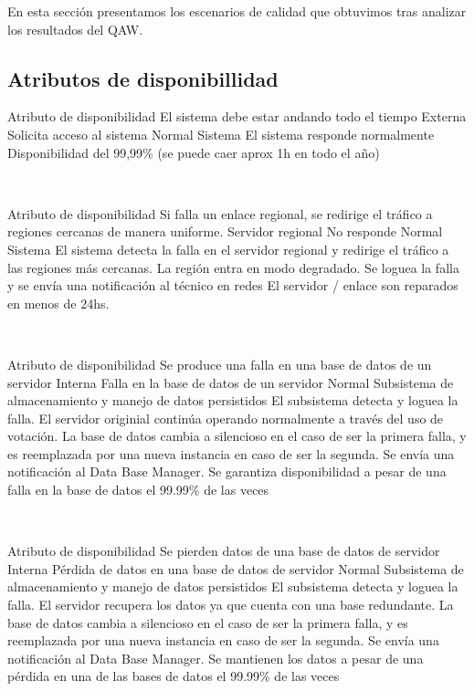 En esta sección presentamos los escenarios de calidad que obtuvimos tras analizar los resultados del QAW.

\subsection{Atributos de disponibillidad}

\escenario
{Atributo de disponibilidad}
{El sistema debe estar andando todo el tiempo}
{Externa}
{Solicita acceso al sistema}
{Normal}
{Sistema}
{El sistema responde normalmente}
{Disponibilidad del 99,99\% (se puede caer aprox 1h en todo el año)}


~

\escenario
{Atributo de disponibilidad}
{Si falla un enlace regional, se redirige el tráfico a regiones cercanas de manera uniforme.}
{Servidor regional}
{No responde}
{Normal}
{Sistema}
{El sistema detecta la falla en el servidor regional y redirige el tráfico a las regiones más cercanas. La región entra en modo degradado. Se loguea la falla y se envía una notificación al técnico en redes}
{El servidor / enlace son reparados en menos de 24hs.}


~

\escenario
{Atributo de disponibilidad}
{Se produce una falla en una base de datos de un servidor}
{Interna}
{Falla en la base de datos de un servidor}
{Normal}
{Subsistema de almacenamiento y manejo de datos persistidos}
{El subsistema detecta y loguea la falla. El servidor originial continúa operando normalmente a través del uso de votación. La base de datos cambia a silencioso en el caso de ser la primera falla, y es reemplazada por una nueva instancia en caso de ser la segunda. Se envía una notificación al Data Base Manager.}
{Se garantiza disponibilidad a pesar de una falla en la base de datos el 99.99\% de las veces}

~

\escenario
{Atributo de disponibilidad}
{Se pierden datos de una base de datos de servidor}
{Interna}
{Pérdida de datos en una base de datos de servidor }
{Normal}
{Subsistema de almacenamiento y manejo de datos persistidos}
{El subsistema detecta y loguea la falla. El servidor recupera los datos ya que cuenta con una base redundante. La base de datos cambia a silencioso en el caso de ser la primera falla, y es reemplazada por una nueva instancia en caso de ser la segunda. Se envía una notificación al Data Base Manager.}
{Se mantienen los datos a pesar de una pérdida en una de las bases de datos el 99.99\% de las veces}

